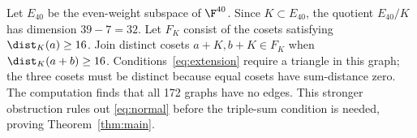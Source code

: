 Let $E_{40}$ be the even-weight subspace of $\F^{40}$. Since $K\subset E_{40}$, the quotient $E_{40}/K$ has dimension $39-7=32$. Let $F_K$ consist of the cosets satisfying $\dist_K(a)\ge16$. Join distinct cosets $a+K,b+K\in F_K$ when $\dist_K(a+b)\ge16$. Conditions~\eqref{eq:extension} require a triangle in this graph; the three cosets must be distinct because equal cosets have sum-distance zero. The computation finds that all 172 graphs have no edges. This stronger obstruction rules out \eqref{eq:normal} before the triple-sum condition is needed, proving Theorem~\ref{thm:main}.
